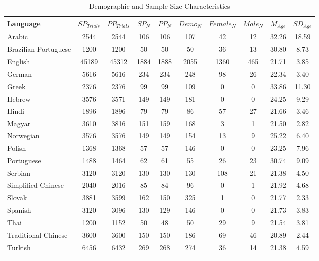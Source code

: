 \documentclass[
  man,mask,floatsintext]{apa7}
\begin{document}
\begin{table}[tbp]

\begin{center}
\begin{threeparttable}

\caption{\label{tab:sample-table}Demographic and Sample Size Characteristics}

\footnotesize{

\begin{tabular}{lccccccccc}
\toprule
Language & $SP_{Trials}$ & $PP_{Trials}$ & $SP_N$ & $PP_N$ & $Demo_N$ & $Female_N$ & $Male_N$ & $M_{Age}$ & $SD_{Age}$\\
\midrule
Arabic & 2544 & 2544 & 106 & 106 & 107 & 42 & 12 & 32.26 & 18.59\\
Brazilian Portuguese & 1200 & 1200 & 50 & 50 & 50 & 36 & 13 & 30.80 & 8.73\\
English & 45189 & 45312 & 1884 & 1888 & 2055 & 1360 & 465 & 21.71 & 3.85\\
German & 5616 & 5616 & 234 & 234 & 248 & 98 & 26 & 22.34 & 3.40\\
Greek & 2376 & 2376 & 99 & 99 & 109 & 0 & 0 & 33.86 & 11.30\\
Hebrew & 3576 & 3571 & 149 & 149 & 181 & 0 & 0 & 24.25 & 9.29\\
Hindi & 1896 & 1896 & 79 & 79 & 86 & 57 & 27 & 21.66 & 3.46\\
Magyar & 3610 & 3816 & 151 & 159 & 168 & 3 & 1 & 21.50 & 2.82\\
Norwegian & 3576 & 3576 & 149 & 149 & 154 & 13 & 9 & 25.22 & 6.40\\
Polish & 1368 & 1368 & 57 & 57 & 146 & 0 & 0 & 23.25 & 7.96\\
Portuguese & 1488 & 1464 & 62 & 61 & 55 & 26 & 23 & 30.74 & 9.09\\
Serbian & 3120 & 3120 & 130 & 130 & 130 & 108 & 21 & 21.38 & 4.50\\
Simplified Chinese & 2040 & 2016 & 85 & 84 & 96 & 0 & 1 & 21.92 & 4.68\\
Slovak & 3881 & 3599 & 162 & 150 & 325 & 1 & 0 & 21.77 & 2.33\\
Spanish & 3120 & 3096 & 130 & 129 & 146 & 0 & 0 & 21.73 & 3.83\\
Thai & 1200 & 1152 & 50 & 48 & 50 & 29 & 9 & 21.54 & 3.81\\
Traditional Chinese & 3600 & 3600 & 150 & 150 & 186 & 69 & 46 & 20.89 & 2.44\\
Turkish & 6456 & 6432 & 269 & 268 & 274 & 36 & 14 & 21.38 & 4.59\\
\bottomrule
\addlinespace
\end{tabular}

}
\end{threeparttable}
\end{center}
\end{table}
\end{document}
